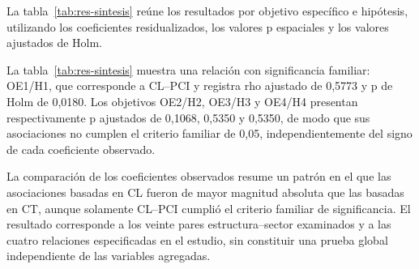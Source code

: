 La tabla~\ref{tab:res-sintesis} reúne los resultados por objetivo específico e hipótesis, utilizando los coeficientes residualizados, los valores p espaciales y los valores ajustados de Holm.

\tablaResultadoDoce

La tabla~\ref{tab:res-sintesis} muestra una relación con significancia familiar: OE1/H1, que corresponde a CL–PCI y registra rho ajustado de 0,5773 y p de Holm de 0,0180. Los objetivos OE2/H2, OE3/H3 y OE4/H4 presentan respectivamente p ajustados de 0,1068, 0,5350 y 0,5350, de modo que sus asociaciones no cumplen el criterio familiar de 0,05, independientemente del signo de cada coeficiente observado.

La comparación de los coeficientes observados resume un patrón en el que las asociaciones basadas en CL fueron de mayor magnitud absoluta que las basadas en CT, aunque solamente CL–PCI cumplió el criterio familiar de significancia. El resultado corresponde a los veinte pares estructura–sector examinados y a las cuatro relaciones especificadas en el estudio, sin constituir una prueba global independiente de las variables agregadas.
\endgroup
